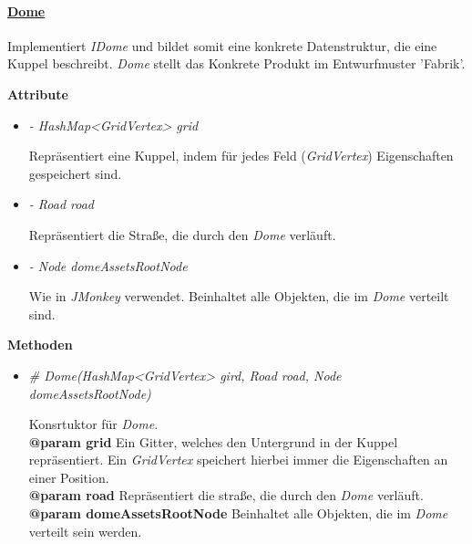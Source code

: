             
            \pagebreak
            \paragraph{\underline{Dome}} \mbox{}\par
            Implementiert \textit{IDome} und bildet somit eine konkrete Datenstruktur, die eine Kuppel beschreibt.
            \textit{Dome} stellt das Konkrete Produkt im Entwurfmuster 'Fabrik'.\par
            
            \textbf{Attribute}
            \begin{itemize}
                \item  \textit{- HashMap<GridVertex> grid} 
                    \begin{leftbar}[0.9\linewidth]
                        Repräsentiert eine Kuppel, indem für jedes Feld (\textit{GridVertex}) Eigenschaften gespeichert sind.
                    \end{leftbar}

                \item  \textit{- Road road} 
                    \begin{leftbar}[0.9\linewidth]
                        Repräsentiert die Straße, die durch den \textit{Dome} verläuft.
                    \end{leftbar}
                
                \item  \textit{- Node domeAssetsRootNode} 
                    \begin{leftbar}[0.9\linewidth]
                        Wie in \textit{JMonkey} verwendet. Beinhaltet alle Objekten, die im \textit{Dome} verteilt sind.
                    \end{leftbar}
            \end{itemize}

            \textbf{Methoden}					
            \begin{itemize}
                \item  \textit{\# Dome(HashMap<GridVertex> gird, Road road, Node domeAssetsRootNode)}
                    \begin{leftbar}[0.9\linewidth]
                        Konsrtuktor für \textit{Dome}.\\
                        \textbf{@param grid} Ein Gitter, welches den Untergrund in der Kuppel repräsentiert. Ein \textit{GridVertex} speichert hierbei 
                            immer die Eigenschaften an einer Position.\\
                        \textbf{@param road} Repräsentiert die straße, die durch den \textit{Dome} verläuft.\\
                        \textbf{@param domeAssetsRootNode} Beinhaltet alle Objekten, die im \textit{Dome} verteilt sein werden.
                    \end{leftbar}    
            \end{itemize}